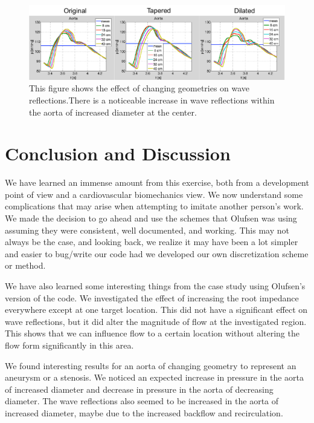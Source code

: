 \documentclass[12pt]{article}
\begin{document}
\begin{figure}[ht]
	\centering
	\label{aorta}
	\includegraphics[width=6.5in]{aortawavereflections}
	\caption{This figure shows the effect of changing geometries on wave reflections.There is a noticeable increase in wave reflections within the aorta of increased diameter at the center.}
\end{figure}

\pagebreak

\section{Conclusion and Discussion}
We have learned an immense amount from this exercise, both from a development point of view and a cardiovascular biomechanics view. We now understand some complications that may arise when attempting to imitate another person's work. We made the decision to go ahead and use the schemes that Olufsen was using assuming they were consistent, well documented, and working. This may not always be the case, and looking back, we realize it may have been a lot simpler and easier to bug/write our code had we developed our own discretization scheme or method. 

We have also learned some interesting things from the case study using Olufsen's version of the code. We investigated the effect of increasing the root impedance everywhere except at one target location. This did not have a significant effect on wave reflections, but it did alter the magnitude of flow at the investigated region. This shows that we can influence flow to a certain location without altering the flow form significantly in this area.

We found interesting results for an aorta of changing geometry to represent an aneurysm or a stenosis. We noticed an expected increase in pressure in the aorta of increased diameter and decrease in pressure in the aorta of decreasing diameter. The wave reflections also seemed to be increased in the aorta of increased diameter, maybe due to the increased backflow and recirculation. 

\pagebreak


\end{document}
